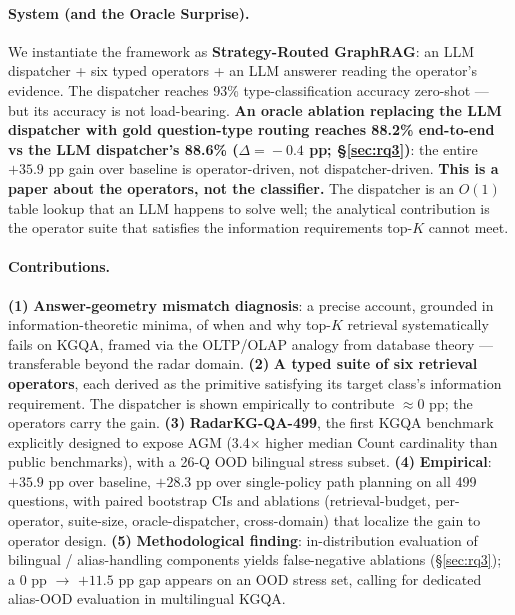 \documentclass[10pt,a4paper,twocolumn]{article}
\begin{document}
\paragraph{System (and the Oracle Surprise).}
We instantiate the framework as \textbf{Strategy-Routed GraphRAG}: an LLM dispatcher + six typed operators + an LLM answerer reading the operator's evidence. The dispatcher reaches 93\% type-classification accuracy zero-shot --- but its accuracy is not load-bearing. \textbf{An oracle ablation replacing the LLM dispatcher with gold question-type routing reaches 88.2\% end-to-end vs the LLM dispatcher's 88.6\% ($\Delta\!=\!-0.4$ pp; §\ref{sec:rq3})}: the entire $+35.9$ pp gain over baseline is operator-driven, not dispatcher-driven. \textbf{This is a paper about the operators, not the classifier.} The dispatcher is an $O(1)$ table lookup that an LLM happens to solve well; the analytical contribution is the operator suite that satisfies the information requirements top-$K$ cannot meet.

\paragraph{Contributions.}
\textbf{(1)} \textbf{Answer-geometry mismatch diagnosis}: a precise account, grounded in information-theoretic minima, of when and why top-$K$ retrieval systematically fails on KGQA, framed via the OLTP/OLAP analogy from database theory --- transferable beyond the radar domain.
\textbf{(2)} \textbf{A typed suite of six retrieval operators}, each derived as the primitive satisfying its target class's information requirement. The dispatcher is shown empirically to contribute ${\approx}0$ pp; the operators carry the gain.
\textbf{(3)} \textbf{RadarKG-QA-499}, the first KGQA benchmark explicitly designed to expose AGM (3.4$\times$ higher median Count cardinality than public benchmarks), with a 26-Q OOD bilingual stress subset.
\textbf{(4)} \textbf{Empirical}: $+35.9$ pp over baseline, $+28.3$ pp over single-policy path planning on all 499 questions, with paired bootstrap CIs and ablations (retrieval-budget, per-operator, suite-size, oracle-dispatcher, cross-domain) that localize the gain to operator design.
\textbf{(5)} \textbf{Methodological finding}: in-distribution evaluation of bilingual / alias-handling components yields false-negative ablations (§\ref{sec:rq3}); a 0 pp $\to$ $+11.5$ pp gap appears on an OOD stress set, calling for dedicated alias-OOD evaluation in multilingual KGQA.

\end{document}
